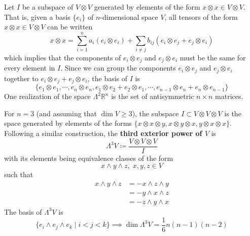 	\begin{example}
	  \label{ex:alt2v-is-antisymmetric-matrices}
    Let $I$ be a subspace of $V \otimes V$ generated by elements of the form $x \otimes x \in V \otimes V$. That is, given a basis $\{e_i\}$ of $n$-dimensional space $V$, all tensors of the form $x \otimes x \in V \otimes V$ can be written 
		\begin{equation}
    	x \otimes x = \sum_{i=1}^n a_i (e_i \otimes e_i) + \sum_{i \neq j} b_{i j} (e_i \otimes e_j + e_j \otimes e_i)
		\end{equation}
    which implies that the components of $e_i \otimes e_j$ and $e_j \otimes e_i$ must be the same for every element in $I$. Since we can group the components $e_i \otimes e_j$ and $e_j \otimes e_i$ together to $e_i \otimes e_j + e_j \otimes e_i$, the basis of $I$ is 
		\begin{equation}
			\{e_1 \otimes e_1, \cdots, e_n \otimes e_n, e_1 \otimes e_2 + e_2 \otimes e_1, \cdots, e_{n-1} \otimes e_n + e_n \otimes e_{n-1}\}
		\end{equation}
		One realization of the space $\Lambda^2 \mathbb{R}^n$ is the set of antisymmetric $n \times n$ matrices. 
	\end{example}

	\begin{example}
	  \label{ex:third-exterior-power}
		For $n = 3$ (and assuming that $\dim{V} \geq 3$), the subspace $I \subset V \otimes V \otimes V$ is the space generated by elements of the forms $\{x \otimes x \otimes y, x \otimes y \otimes x, y \otimes x \otimes x\}$. Following a similar construction, the \textbf{third exterior power of $V$} is
		\begin{equation}
			\Lambda^3 V \coloneqq \frac{V \otimes V \otimes V}{I}
		\end{equation}
		with its elements being equivalence classes of the form
		\begin{equation}
			x \wedge y \wedge z,\; x, y, z \in V
		\end{equation}
		such that
		\begin{align*}
			x \wedge y \wedge z & = - x \wedge z \wedge y \\
			& = - y \wedge x \wedge z \\
			& = - z \wedge y \wedge x
		\end{align*}
		The basis of $\Lambda^3 V$ is
		\begin{equation}
			\{e_i \wedge e_j \wedge e_k \; | \; i < j < k\} \implies \dim{\Lambda^3 V} = \frac{1}{6} n (n-1) (n-2)
		\end{equation}
	\end{example}

